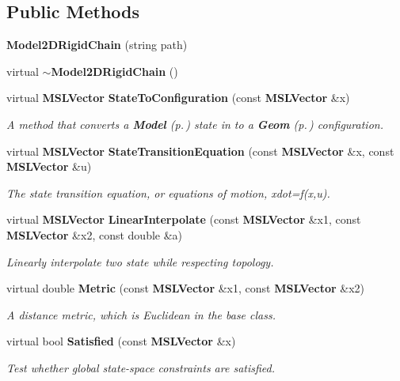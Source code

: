 \subsection*{Public Methods}
\begin{CompactItemize}
\item 
{\bf Model2DRigid\-Chain} (string path)
\item 
virtual {\bf $\sim$Model2DRigid\-Chain} ()
\item 
virtual {\bf MSLVector} {\bf State\-To\-Configuration} (const {\bf MSLVector} \&x)
\begin{CompactList}\small\item\em A method that converts a {\bf Model} {\rm (p.\,\pageref{class_Model})} state in to a {\bf Geom} {\rm (p.\,\pageref{class_Geom})} configuration.\item\end{CompactList}\item 
virtual {\bf MSLVector} {\bf State\-Transition\-Equation} (const {\bf MSLVector} \&x, const {\bf MSLVector} \&u)
\begin{CompactList}\small\item\em The state transition equation, or equations of motion, xdot=f(x,u).\item\end{CompactList}\item 
virtual {\bf MSLVector} {\bf Linear\-Interpolate} (const {\bf MSLVector} \&x1, const {\bf MSLVector} \&x2, const double \&a)
\begin{CompactList}\small\item\em Linearly interpolate two state while respecting topology.\item\end{CompactList}\item 
virtual double {\bf Metric} (const {\bf MSLVector} \&x1, const {\bf MSLVector} \&x2)
\begin{CompactList}\small\item\em A distance metric, which is Euclidean in the base class.\item\end{CompactList}\item 
virtual bool {\bf Satisfied} (const {\bf MSLVector} \&x)
\begin{CompactList}\small\item\em Test whether global state-space constraints are satisfied.\item\end{CompactList}\end{CompactItemize}

